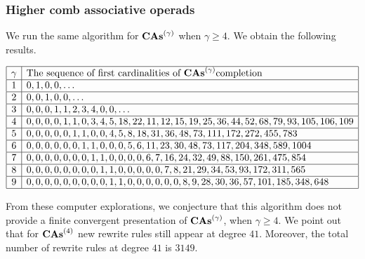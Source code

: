 \medbreak
\subsubsection{Higher comb associative operads}
\label{sec:higher_comb_associative_operads}

We run the same algorithm for $\mathbf{CAs}^{\left(\gamma\right)}$ when $\gamma \geq 4$.
We obtain the following results.
\medbreak

\begin{center}
  \begin{math} \label{arr:completions_CAs}
    \begin{array}{|c|l|}
      \hline
      \gamma & \mbox{The sequence of first cardinalities of }
       \mathbf{CAs}^{\left(\gamma\right)} \mbox{completion}\\ \hline
      1 & 0, 1, 0, 0, \dots \\ \hline
      2 & 0, 0, 1, 0, 0, \dots \\ \hline
      3 & 0, 0, 0, 1, 1, 2, 3, 4, 0, 0, \dots \\ \hline
      4 & 0, 0, 0, 0, 1, 1, 0, 3, 4, 5, 18, 22, 11, 12, 15, 19, 25, 36,
       44, 52, 68, 79, 93, 105, 106, 109 \\ \hline
      5 & 0, 0, 0, 0, 0, 1, 1, 0, 0, 4, 5, 8, 18, 31, 36, 48, 73, 111,
       172, 272, 455, 783 \\ \hline
      6 & 0, 0, 0, 0, 0, 0, 1, 1, 0, 0, 0, 5, 6, 11, 23, 30, 48, 73,
      117, 204, 348, 589, 1004 \\ \hline
      7 & 0, 0, 0, 0, 0, 0, 0, 1, 1, 0, 0, 0, 0, 6, 7, 16, 24, 32, 49,
      88, 150, 261, 475, 854\\ \hline
      8 & 0, 0, 0, 0, 0, 0, 0, 0, 1, 1, 0, 0, 0, 0, 0, 7, 8, 21, 29,
      34, 53, 93, 172, 311, 565\\ \hline
      9 & 0, 0, 0, 0, 0, 0, 0, 0, 0, 1, 1, 0, 0, 0, 0, 0, 0, 8, 9, 28,
      30, 36, 57, 101, 185, 348, 648\\ \hline
    \end{array}
  \end{math}
\end{center}
\medbreak

From these computer explorations, we conjecture that this algorithm
does not provide a finite convergent presentation of $\mathbf{CAs}^{\left(\gamma\right)}$,
when $\gamma \geq 4$. We point out that for $\mathbf{CAs}^{\left(4\right)}$ new
rewrite rules still appear at degree $41$. Moreover, the total number of
rewrite rules at degree $41$ is $3149$.
\medbreak


